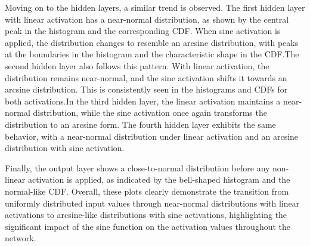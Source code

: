\documentclass{ioereport}
\begin{document}
    Moving on to the hidden layers, a similar trend is observed. The first hidden layer with linear activation has a near-normal distribution, as shown by the central peak in the histogram and the corresponding CDF. When sine activation is applied, the distribution changes to resemble an arcsine distribution, with peaks at the boundaries in the histogram and the characteristic shape in the CDF.The second hidden layer also follows this pattern. With linear activation, the distribution remains near-normal, and the sine activation shifts it towards an arcsine distribution. This is consistently seen in the histograms and CDFs for both activations.In the third hidden layer, the linear activation maintains a near-normal distribution, while the sine activation once again transforms the distribution to an arcsine form. The fourth hidden layer exhibits the same behavior, with a near-normal distribution under linear activation and an arcsine distribution with sine activation.

    Finally, the output layer shows a close-to-normal distribution before any non-linear activation is applied, as indicated by the bell-shaped histogram and the normal-like CDF. Overall, these plots clearly demonstrate the transition from uniformly distributed input values through near-normal distributions with linear activations to arcsine-like distributions with sine activations, highlighting the significant impact of the sine function on the activation values throughout the network.
\end{document}
